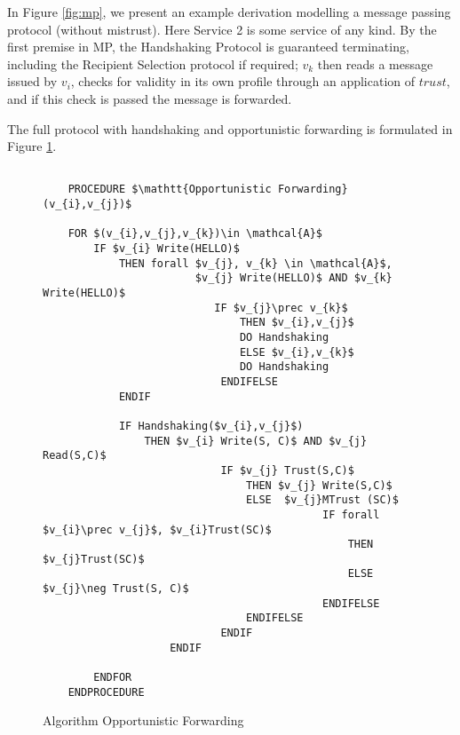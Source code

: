\documentclass[compsoc, conference, letterpaper, 10pt, times]{IEEEtran}
\begin{document}
In Figure \ref{fig:mp}, we present an example derivation modelling a message passing protocol (without mistrust). Here Service 2 is some service of any kind. By the first premise in MP, the Handshaking Protocol is guaranteed terminating, including the Recipient Selection protocol if required; $v_{k}$ then reads a message issued by $v_{i}$, checks for validity in its own profile through an application of $trust$, and if this check is passed the message is forwarded.



\begin{figure*}
	\begin{prooftree}
		\end{prooftree}

	\caption{The Message Passing Protocol}\label{fig:mp}
\end{figure*}


The full protocol with handshaking and opportunistic forwarding is formulated in Figure \ref{fig:routine1}.


\begin{figure}[t]
	\lstset{language=Java,
		basicstyle=\scriptsize,
		mathescape}
%	
	\begin{lstlisting}[frame=single]  % Start your code-block
	
	PROCEDURE $\mathtt{Opportunistic Forwarding}(v_{i},v_{j})$
	
	FOR $(v_{i},v_{j},v_{k})\in \mathcal{A}$
	    IF $v_{i} Write(HELLO)$ 
	        THEN forall $v_{j}, v_{k} \in \mathcal{A}$, 
				        $v_{j} Write(HELLO)$ AND $v_{k} Write(HELLO)$
					       IF $v_{j}\prec v_{k}$ 
						       THEN $v_{i},v_{j}$ 
						       DO Handshaking
						       ELSE $v_{i},v_{k}$
						       DO Handshaking
						    ENDIFELSE
			ENDIF
			
			IF Handshaking($v_{i},v_{j}$)
				THEN $v_{i} Write(S, C)$ AND $v_{j} Read(S,C)$ 
							IF $v_{j} Trust(S,C)$
								THEN $v_{j} Write(S,C)$
								ELSE  $v_{j}MTrust (SC)$
											IF forall $v_{i}\prec v_{j}$, $v_{i}Trust(SC)$
												THEN $v_{j}Trust(SC)$
												ELSE $v_{j}\neg Trust(S, C)$
											ENDIFELSE
								ENDIFELSE
							ENDIF
					ENDIF
				
		ENDFOR
	ENDPROCEDURE
	\end{lstlisting}
	\caption{Algorithm Opportunistic Forwarding}\label{fig:routine1}
\end{figure}
\end{document}
